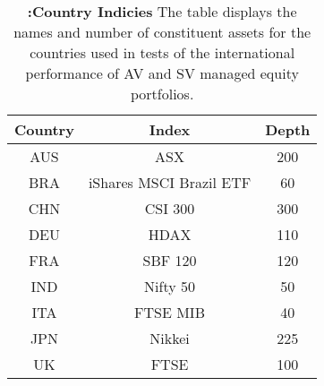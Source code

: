 \begin{table}[!htbp] 
	\centering \caption{\textbf{:Country Indicies} \newline
		\footnotesize{The table displays the names and number of constituent assets for the countries used in tests of the international performance of AV and SV managed equity portfolios.}} \vspace{3mm}
	\label{tab_countries}
\begin{tabular}{ccc}
	Country & Index & Depth \\ 
	\hline
	AUS	& ASX & 200 \\ 
	BRA & iShares MSCI Brazil ETF & 60 \\ 
	CHN & CSI 300 & 300 \\ 
	DEU & HDAX & 110 \\ 
	FRA & SBF 120 & 120 \\ 
	IND & Nifty 50  & 50 \\ 
	ITA & FTSE MIB  & 40 \\ 
	JPN & Nikkei & 225 \\ 
	UK & FTSE & 100\\
	\hline
\end{tabular} 
\end{table}